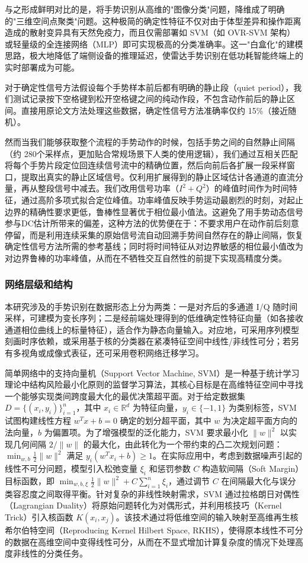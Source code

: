 与之形成鲜明对比的是，将手势识别从高维的"图像分类"问题，降维成了明确的"三维空间点聚类"问题。这种极简的确定性特征不仅对由于体型差异和操作距离造成的散射变异具有天然免疫力，而且仅需部署如 SVM（如 OVR-SVM 架构）或轻量级的全连接网络（MLP）即可实现极高的分类准确率。这一"白盒化"的建模思路，极大地降低了端侧设备的推理延迟，使雷达手势识别在低功耗智能终端上的实时部署成为可能。

对于确定性信号方法假设每个手势样本前后都有明确的静止段（quiet period），我们测试记录按下空格键到松开空格键之间的纯动作段，不包含动作前后的静止区间。直接用原论文方法处理这些数据，确定性信号方法准确率仅约 15\%（接近随机）。

然而当我们能够获取整个流程的手势动作的时候，包括手势之间的自然静止间隔（约 280个采样点，更加贴合常规场景下人类的使用逻辑），我们通过互相关匹配将每个手势片段定位回连续信号流中的精确位置，然后向前后各扩展一段采样窗口，提取出真实的静止区域信号。仅利用扩展得到的静止区域估计各通道的直流分量，再从整段信号中减去。我们改用信号功率（$I^2 + Q^2$）的峰值时间作为时间特征，通过高阶多项式拟合定位峰值。功率峰值反映手势运动最剧烈的时刻，对起止边界的精确性要求更低，鲁棒性显著优于相位最小值法。这避免了用手势动态信号参与DC估计所带来的偏差，这种方法的优势便在于：不要求用户在动作前后刻意停留，而是利用连续采集的原始信号流自动回溯手势间自然存在的静止间隔，恢复确定性信号方法所需的参考基线；同时将时间特征从对边界敏感的相位最小值改为对边界鲁棒的功率峰值，从而在不牺牲交互自然性的前提下实现高精度分类。

\subsubsection{网络层级和结构}

本研究涉及的手势识别在数据形态上分为两类：一是对齐后的多通道 I/Q 随时间采样，可建模为变长序列；二是经前端处理得到的低维确定性特征向量（如各接收通道相位曲线上的标量特征），适合作为静态向量输入。对应地，可采用序列模型刻画时序依赖，或采用基于核的分类器在紧凑特征空间中线性/非线性可分；若另有多视角或成像式表征，还可采用卷积网络迁移学习。

简单网络中的支持向量机（Support Vector Machine, SVM）是一种基于统计学习理论中结构风险最小化原则的监督学习算法，其核心目标是在高维特征空间中寻找一个能够实现类间跨度最大化的最优决策超平面。对于给定数据集 $D = \{(x_{i}, y_{i})\}_{i=1}^{n}$，其中 $x_{i} \in \mathbb{R}^{d}$ 为特征向量，$y_{i} \in \{-1, 1\}$ 为类别标签，SVM 试图构建线性方程 $w^{T}x + b = 0$ 确定的划分超平面，其中 $w$ 为决定超平面方向的法向量，$b$ 为偏置项。为了增强模型的泛化能力，SVM 要求最小化 $\|w\|^{2}$ 以实现几何间隔 $2/\|w\|$ 的最大化，由此转化为一个带约束的凸二次规划问题：$\min_{w,b}\frac{1}{2}\|w\|^{2}$ 满足 $y_{i}(w^{T}x_{i} + b) \geq 1$。在实际应用中，考虑到数据噪声引起的线性不可分问题，模型引入松弛变量 $\xi_{i}$ 和惩罚参数 $C$ 构造软间隔（Soft Margin）目标函数，即 $\min_{w,b,\xi}\frac{1}{2}\|w\|^{2} + C\sum_{i=1}^{n}\xi_{i}$，通过调节 $C$ 在间隔最大化与误分类容忍度之间取得平衡。针对复杂的非线性映射需求，SVM 通过拉格朗日对偶性（Lagrangian Duality）将原始问题转化为对偶形式，并利用核技巧（Kernel Trick）引入核函数 $K(x_{i}, x_{j})$。该技术通过将低维空间的输入映射至高维再生核希尔伯特空间（Reproducing Kernel Hilbert Space, RKHS），使得原本线性不可分的数据在高维空间中变得线性可分，从而在不显式增加计算复杂度的情况下处理高度非线性的分类任务。

